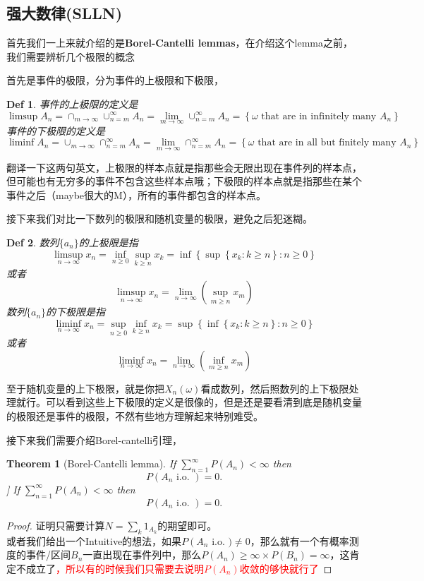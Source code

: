 \documentclass{article}
\newtheorem{theorem}{Theorem}[section]
\newtheorem{defination}{Def}[section]
\newtheorem*{proof}{Proof}
\begin{document}
\subsection{强大数律(SLLN)}
首先我们一上来就介绍的是\textbf{Borel-Cantelli lemmas}，在介绍这个lemma之前，我们需要辨析几个极限的概念
\par 首先是事件的极限，分为事件的上极限和下极限，
\begin{defination}
	事件的上极限的定义是
$$
\limsup A_n=\cap_{m\to\infty}\cup_{n=m}^{\infty} A_n=\lim _{m \rightarrow \infty} \cup_{n=m}^{\infty} A_n=\left\{\omega \text { that are in infinitely many } A_n\right\}
$$
	事件的下极限的定义是
	$$
	\liminf A_n=\cup_{m\to\infty}\cap_{n=m}^{\infty} A_n=\lim _{m \rightarrow \infty} \cap_{n=m}^{\infty} A_n=\left\{\omega \text { that are in all but finitely many } A_n\right\}
	$$
\end{defination}
翻译一下这两句英文，上极限的样本点就是指那些会无限出现在事件列的样本点，但可能也有无穷多的事件不包含这些样本点哦；下极限的样本点就是指那些在某个事件之后（maybe很大的M），所有的事件都包含的样本点。
\par 接下来我们对比一下数列的极限和随机变量的极限，避免之后犯迷糊。
\begin{defination}
	数列$\{a_n\}$的上极限是指
	$$
	\limsup _{n \rightarrow \infty} x_n=\inf _{n \geq 0} \sup _{k \geq n} x_k=\inf \left\{\sup \left\{x_k: k \geq n\right\}: n \geq 0\right\}
	$$
	或者
	$$
	\limsup _{n \rightarrow \infty} x_n=\lim _{n \rightarrow \infty}\left(\sup _{m \geq n} x_m\right)
	$$
	数列$\{a_n\}$的下极限是指
	$$
	\liminf _{n \rightarrow \infty} x_n=\sup _{n \geq 0} \inf _{k \geq n} x_k=\sup \left\{\inf \left\{x_k: k \geq n\right\}: n \geq 0\right\}
	$$
	或者
	$$
	\liminf _{n \rightarrow \infty} x_n=\lim _{n \rightarrow \infty}\left(\inf _{m \geq n} x_m\right)
	$$
\end{defination}
至于随机变量的上下极限，就是你把$X_n({\omega})$看成数列，然后照数列的上下极限处理就行。可以看到这些上下极限的定义是很像的，但是还是要看清到底是随机变量的极限还是事件的极限，不然有些地方理解起来特别难受。
\par 接下来我们需要介绍Borel-cantelli引理，
\begin{theorem}[Borel-Cantelli lemma]
	If $\sum_{n=1}^{\infty} P\left(A_n\right)<\infty$ then
	$$
	P\left(A_n \text { i.o. }\right)=0 .
	$$]
	If $\sum_{n=1}^{\infty} P\left(A_n\right)<\infty$ then
	$$
	P\left(A_n \text { i.o. }\right)=0 .
	$$
\end{theorem}
\begin{proof}
	证明只需要计算$N=\sum_k 1_{A_k}$的期望即可。\\
	或者我们给出一个Intuitive的想法，如果$P\left(A_n\right.$ i.o. $)\ne0$，那么就有一个有概率测度的事件/区间$B_n$一直出现在事件列中，那么$P\left(A_n\right)\geq \infty\times P(B_n)=\infty$，这肯定不成立了\textcolor{red}{，所以有的时候我们只需要去说明$P(A_n)$收敛的够快就行了}
\end{proof}
\end{document}
